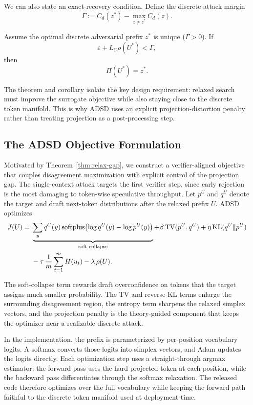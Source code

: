 We can also state an exact-recovery condition. Define the discrete attack
margin
\[
\Gamma := C_d(z^*) - \max_{z \neq z^*} C_d(z).
\]

\begin{corollary}
\label{cor:exact-recovery}
Assume the optimal discrete adversarial prefix $z^*$ is unique
($\Gamma > 0$). If
\[
\varepsilon + L_C \rho(U^*) < \Gamma,
\]
then
\[
\Pi(U^*) = z^*.
\]
\end{corollary}

The theorem and corollary isolate the key design requirement: relaxed search
must improve the surrogate objective while also staying close to the discrete
token manifold. This is why ADSD uses an explicit projection-distortion
penalty rather than treating projection as a post-processing step.

\subsection{The ADSD Objective Formulation}

Motivated by Theorem~\ref{thm:relax-gap}, we construct a verifier-aligned
objective that couples disagreement maximization with explicit control of the
projection gap. The single-context attack targets the first verifier step,
since early rejection is the most damaging to token-wise speculative
throughput. Let $p^U$ and $q^U$ denote the target and draft next-token
distributions after the relaxed prefix $U$. ADSD optimizes
\begin{align*}
J(U) ={}&
\underbrace{\sum_{y} q^U(y)\,\mathrm{softplus}\!\left(\log q^U(y)-\log p^U(y)\right)}_{\text{soft collapse}}
+ \beta \,\mathrm{TV}(p^U, q^U)
+ \eta \,\mathrm{KL}(q^U \Vert p^U) \\
&- \tau \,\frac{1}{m}\sum_{t=1}^{m} H(u_t)
- \lambda \,\rho(U).
\end{align*}

The soft-collapse term rewards draft overconfidence on tokens that the target
assigns much smaller probability. The TV and reverse-KL terms enlarge the
surrounding disagreement region, the entropy term sharpens the relaxed simplex
vectors, and the projection penalty is the theory-guided component that keeps
the optimizer near a realizable discrete attack.

In the implementation, the prefix is parameterized by per-position vocabulary
logits. A softmax converts those logits into simplex vectors, and Adam updates
the logits directly. Each optimization step uses a straight-through argmax
estimator: the forward pass uses the hard projected token at each position,
while the backward pass differentiates through the softmax relaxation. The
released code therefore optimizes over the full vocabulary while keeping the
forward path faithful to the discrete token manifold used at deployment time.

